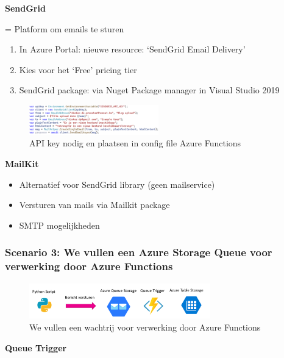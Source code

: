 \documentclass{article}
\newcommand{\bold}[1]{\textbf{#1}}
\begin{document}
\bold{SendGrid}

= Platform om emails te sturen

\begin{enumerate}
    \item In Azure Portal: nieuwe resource: `SendGrid Email Delivery'
    \item Kies voor het `Free' pricing tier
    \item SendGrid package: via Nuget Package manager in Visual Studio 2019
\end{enumerate}

\begin{figure}[H]
    \centering
    \includegraphics[width=0.5\textwidth]{scenario-2-3.png}
    \caption{API key nodig en plaatsen in config file Azure Functions}
\end{figure}


\bold{MailKit}

\begin{itemize}
    \item Alternatief voor SendGrid library (geen mailservice)
    \item Versturen van mails via Mailkit package
    \item SMTP mogelijkheden
\end{itemize}

\subsubsection{Scenario 3: We vullen een Azure Storage Queue voor verwerking door Azure Functions}

\begin{figure}[H]
    \centering
    \includegraphics[width=0.7\textwidth]{azure-storage-scenario-3.png}
    \caption{We vullen een wachtrij voor verwerking door Azure Functions}
\end{figure}

\bold{Queue Trigger}
\end{document}
